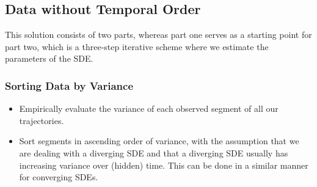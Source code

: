 \documentclass[a4paper, 11pt]{article}
\begin{document}
\begin{sloppypar}
\subsection{Data without Temporal Order}
This solution consists of two parts, whereas part one serves as a starting point for part two, which
is a three-step iterative scheme where we estimate the parameters of the SDE.
\subsubsection{Sorting Data by Variance}
\begin{itemize}
  \item Empirically evaluate the variance of each observed segment of all
  our trajectories.
  \item Sort segments in ascending order of variance, with the assumption that we
  are dealing with a diverging SDE and that a diverging SDE usually has increasing
  variance over (hidden) time. This can be done in a similar manner for converging SDEs.
\end{itemize}


\end{sloppypar}
\end{document}

